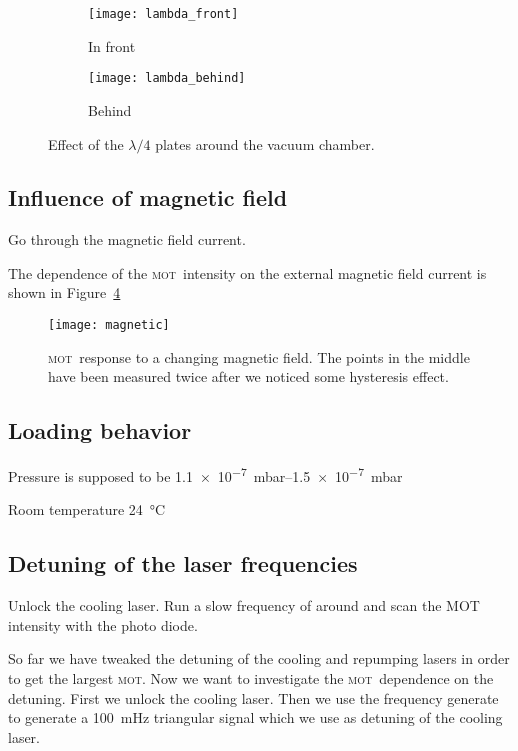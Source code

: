 \documentclass[11pt, english, fleqn, DIV=15, headinclude, BCOR=2cm]{scrreprt}
\newcommand\mot{\textsc{mot}}
\begin{document}
\begin{figure}
    \centering
    \begin{subfigure}[c]{0.48\linewidth}
    \centering
    \texttt{[image: lambda\_front]}
    \caption{%
        In front
    }
    \label{fig:lambda_front}
    \end{subfigure}
    \hfill
    \begin{subfigure}[c]{0.48\linewidth}
    \centering
    \texttt{[image: lambda\_behind]}
    \caption{%
        Behind
    }
    \label{fig:lambda_behind}
    \end{subfigure}
    \caption{%
        Effect of the $\lambda/4$ plates around the vacuum chamber.
    }
    \label{fig:}
\end{figure}

\subsection{Influence of magnetic field}

Go through the magnetic field current.


The dependence of the \mot\ intensity on the external magnetic field current is
shown in Figure~\ref{fig:magnetic}

\begin{figure}
    \centering
    \texttt{[image: magnetic]}
    \caption{%
        \mot\ response to a changing magnetic field. The points in the middle
        have been measured twice after we noticed some hysteresis effect.
    }
    \label{fig:magnetic}
\end{figure}

\subsection{Loading behavior}

Pressure is supposed to be \SIrange{1.1e-7}{1.5e-7}{\milli\bar}

Room temperature \SI{24}{\celsius}

\subsection{Detuning of the laser frequencies}

Unlock the cooling laser. Run a slow frequency of around
and scan the MOT intensity with the photo diode. 

So far we have tweaked the detuning of the cooling and repumping lasers in
order to get the largest \mot. Now we want to investigate the \mot\ dependence
on the detuning. First we unlock the cooling laser. Then we use the frequency
generate to generate a \SI{100}{\milli\hertz} triangular signal which we use
as detuning of the cooling laser.
\end{document}
